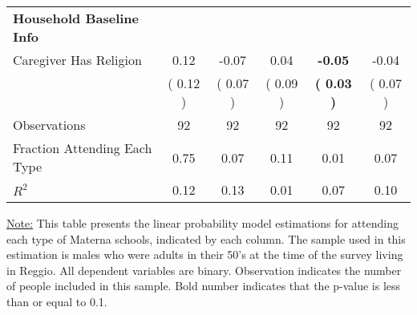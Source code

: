 \begin{table}[H]
{\begin{tabular}{lccccc}
\midrule
\textbf{Household Baseline Info} \\
\quad Caregiver Has Religion &      0.12 &     -0.07 &      0.04 & \textbf{    -0.05} &     -0.04 \\
\quad  & (     0.12 ) & (     0.07 )  & (     0.09 )  & \textbf{(     0.03 )} & (     0.07 ) \\
\midrule
Observations & 92 & 92 & 92 & 92 & 92 \\
Fraction Attending Each Type &      0.75 &      0.07 &      0.11 &      0.01 &      0.07 \\
\midrule
$ R^2$ &      0.12 &      0.13 &      0.01 &      0.07 &      0.10 \\
\bottomrule
\end{tabular}}
\end{table}
\begin{footnotesize}
\noindent\underline{Note:} This table presents the linear probability model estimations for attending each type of Materna schools, indicated by each column. The sample used in this estimation is males who were adults in their 50's at the time of the survey living in Reggio. All dependent variables are binary. Observation indicates the number of people included in this sample. Bold number indicates that the p-value is less than or equal to 0.1.
\end{footnotesize}
